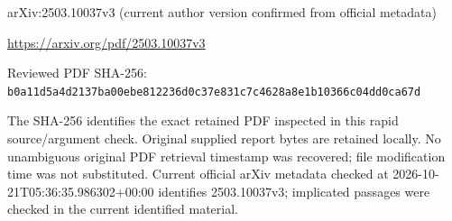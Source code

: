 \documentclass[11pt]{article}
\begin{document}
arXiv:2503.10037v3 (current author version confirmed from official metadata)

\url{https://arxiv.org/pdf/2503.10037v3}

Reviewed PDF SHA-256: \nolinkurl{b0a11d5a4d2137ba00ebe812236d0c37e831c7c4628a8e1b10366c04dd0ca67d}

The SHA-256 identifies the exact retained PDF inspected in this rapid source/argument check. Original supplied report bytes are retained locally. No unambiguous original PDF retrieval timestamp was recovered; file modification time was not substituted. Current official arXiv metadata checked at 2026-10-21T05:36:35.986302+00:00 identifies 2503.10037v3; implicated passages were checked in the current identified material.
\end{document}
